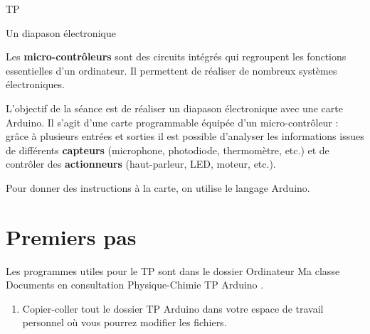 \documentclass[12pt,a4paper]{article}
\begin{document}
\begin{header}
TP

Un diapason électronique
\end{header}

Les \textbf{micro-contrôleurs} sont des circuits intégrés qui regroupent les fonctions essentielles d'un ordinateur.
Il permettent de réaliser de nombreux systèmes électroniques.

L'objectif de la séance est de réaliser un diapason électronique avec une carte Arduino.
Il s'agit d'une carte programmable équipée d'un micro-contrôleur : grâce à plusieurs entrées et sorties il est possible d'analyser les informations issues de différents \textbf{capteurs} (microphone, photodiode, thermomètre, etc.) et de contrôler des \textbf{actionneurs} (haut-parleur, LED, moteur, etc.).

Pour donner des instructions à la carte, on utilise le langage Arduino.

\section*{Premiers pas}

Les programmes utiles pour le TP sont dans le dossier \og Ordinateur \textrightarrow{} Ma classe \textrightarrow{} Documents en consultation \textrightarrow{} Physique-Chimie \textrightarrow{} TP Arduino \fg{}.
\begin{enumerate}
\item \rea{}

Copier-coller tout le dossier \og TP Arduino \fg{}  dans votre espace de travail personnel où vous pourrez modifier les fichiers.
\end{enumerate}
\end{document}
